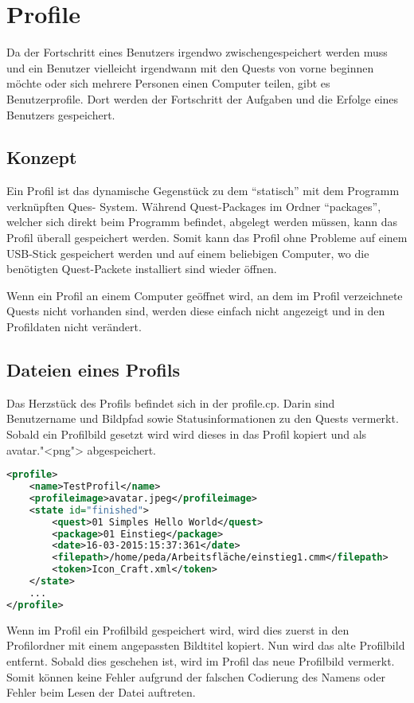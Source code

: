\section{Profile}
Da der Fortschritt eines Benutzers irgendwo zwischengespeichert werden muss und ein Benutzer vielleicht irgendwann mit den Quests von vorne beginnen möchte oder sich mehrere Personen einen Computer teilen, gibt es Benutzerprofile. Dort werden der Fortschritt der Aufgaben und die Erfolge eines Benutzers gespeichert.

\subsection{Konzept}
Ein Profil ist das dynamische Gegenstück zu dem "`statisch"' mit dem Programm verknüpften Ques- System. Während Quest-Packages im Ordner "`packages"', welcher sich direkt beim Programm befindet, abgelegt werden müssen, kann das Profil überall gespeichert werden. Somit kann das Profil ohne Probleme auf einem USB-Stick gespeichert werden und auf einem beliebigen Computer, wo die benötigten Quest-Packete installiert sind wieder öffnen.

Wenn ein Profil an einem Computer geöffnet wird, an dem im Profil verzeichnete Quests nicht vorhanden sind, werden diese einfach nicht angezeigt und in den Profildaten nicht verändert.

\subsection{Dateien eines Profils}
Das Herzstück des Profils befindet sich in der profile.cp. Darin sind Benutzername und Bildpfad sowie Statusinformationen zu den Quests vermerkt. Sobald ein Profilbild gesetzt wird wird dieses in das Profil kopiert und als avatar."<png"> abgespeichert.

\begin{lstlisting}[language=XML]
<profile>
	<name>TestProfil</name>
	<profileimage>avatar.jpeg</profileimage>
	<state id="finished">
		<quest>01 Simples Hello World</quest>
		<package>01 Einstieg</package>
		<date>16-03-2015:15:37:361</date>
		<filepath>/home/peda/Arbeitsfläche/einstieg1.cmm</filepath>
		<token>Icon_Craft.xml</token>
	</state>
	...
</profile>
\end{lstlisting}
Wenn im Profil ein Profilbild gespeichert wird, wird dies zuerst in den Profilordner mit einem angepassten Bildtitel kopiert. Nun wird das alte Profilbild entfernt. Sobald dies geschehen ist, wird im Profil das neue Profilbild vermerkt. Somit können keine Fehler aufgrund der falschen Codierung des Namens oder Fehler beim Lesen der Datei auftreten.

